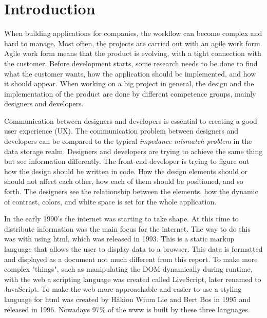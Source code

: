 \section{Introduction}



When building applications for companies, the workflow can become complex and hard to manage. Most often, the projects are carried out with an agile work form\cite{cohen2004introduction}. Agile work form means that the product is evolving, with a tight connection with the customer. Before development starts, some research needs to be done to find what the customer wants, how the application should be implemented, and how it should appear. When working on a big project in general, the design and the implementation of the product are done by different competence groups, mainly designers and developers. 

Communication between designers and developers is essential to creating a good user experience (UX). The communication problem between designers and developers can be compared to the typical \textit{impedance mismatch problem} in the data storage realm. Designers and developers are trying to achieve the same thing but see information differently. The front-end developer is trying to figure out how the design should be written in code. How the design elements should or should not affect each other, how each of them should be positioned, and so forth. The designers see the relationship between the elements, how the dynamic of contrast, colors, and white space is set for the whole application. 

In the early 1990's the internet was starting to take shape\cite{WebD2BriefHistory}. At this time to distribute information was the main focus for the internet. The way to do this was with using \acrfull{html}, which was released in 1993\cite{WebD2BriefHistory}. This is a static markup language that allows the user to display data to a browser. This data is formatted and displayed as a document not much different from this report. To make more complex "things", such as manipulating the DOM dynamically during runtime, with the web a scripting language was created called LiveScript, later renamed to JavaScript\cite{JavaScript2021}. To make the web more approachable and easier to use a styling language for \acrshort{html} was created by Håkion Wium Lie and Bert Bos in 1995 and released in 1996\cite{BriefHistoryCSS}. Nowadays 97\% of the \acrlong{www} is built by these three languages\cite{JavaScript2021}.

